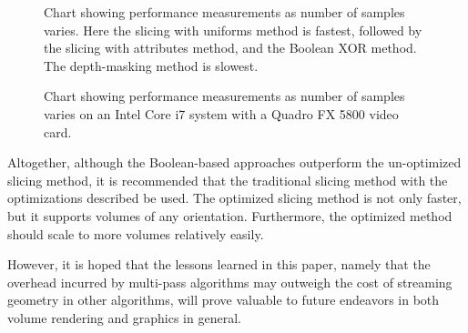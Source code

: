 \documentclass{report}
\begin{document}
\begin{figure}
\centering
{}
\caption{
Chart showing performance measurements as number of samples varies.  Here the
slicing with uniforms method is fastest, followed by the slicing with attributes
method, and the Boolean XOR method.  The depth-masking method is slowest.
}
\label{desktop-performance-chart}
\end{figure}

\begin{figure}
\centering
{}
\caption{
Chart showing performance measurements as number of samples varies on an Intel
Core i7 system with a Quadro FX 5800 video card.
}
\label{workstation-performance-chart}
\end{figure}

Altogether, although the Boolean-based approaches outperform the un-optimized
slicing method, it is recommended that the traditional slicing method with the
optimizations described be used.  The optimized slicing method is not only
faster, but it supports volumes of any orientation.  Furthermore, the optimized
method should scale to more volumes relatively easily.

However, it is hoped that the lessons learned in this paper, namely that the
overhead incurred by multi-pass algorithms may outweigh the cost of streaming
geometry in other algorithms, will prove valuable to future endeavors in both
volume rendering and graphics in general.


\newpage


\end{document}
